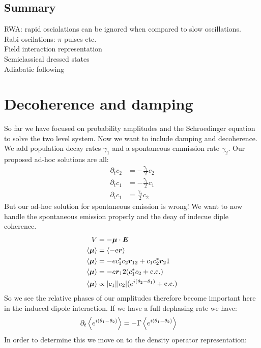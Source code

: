 \subsection{Summary}
RWA: rapid oscialations can be ignored when compared to slow oscillations.\\
Rabi oscilations: $\pi$ pulses etc. \\
Field interaction representation \\
Semiclassical dressed states \\
Adiabatic following \\
\section{Decoherence and damping}
So far we have focused on probability amplitudes and the Schroedinger equation to solve the two level system. Now we want to include damping and decoherence. We add population decay rates $\gamma_1$ and a spontaneous emmission rate $\gamma_2$. Our proposed ad-hoc solutions are all:
\begin{align*}
	\partial_t c_2 &= -\frac{\gamma_1}{2} c_2  \\
	\partial_t c_1 &= -\frac{\gamma_1}{2} c_1 \\
	\partial_t c_1 &= \frac{\gamma_2}{2} c_2
\end{align*}
But our ad-hoc solution for spontaneous emission is wrong! We want to now handle the spontaneous emission properly and the deay of indecue diple coherence. 
\begin{align*}
	V &= -\bm{\mu}\cdot \bm{E} \\
	\expval{\bm{\mu}} &= \expval{-e\bm{r}} \\
	\expval{\bm{\mu}} &= -ec_1^*c_2\bm{r}_{12} + c_1c_2^*\bm{r}_21 \\
	\expval{\bm{\mu}} &= -e\bm{r}_12 (c_1^*c_2 + \text{c.c.}) \\
	\expval{\bm{\mu}} &\propto |c_1||c_2|(e^{i(\theta_2 - \theta_1)} + \text{c.c.})
\end{align*}
So we see the relative phases of our amplitudes therefore become important here in the induced dipole interaction. If we have a full dephasing rate we have:
\begin{align*}
	\partial_t \expval{e^{i(\theta_1 - \theta_2)}} &= -\Gamma\expval{e^{i(\theta_1 - \theta_2)}} 
\end{align*}
In order to determine this we move on to the density operator representation:
